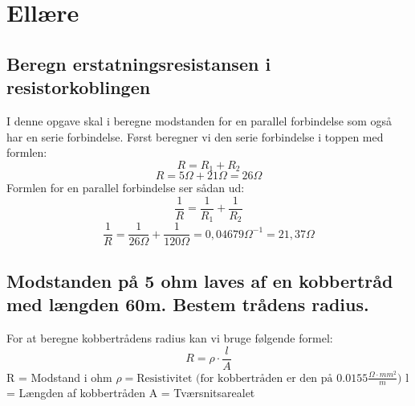 \section{Ellære}
\subsection{Beregn erstatningsresistansen i resistorkoblingen}
I denne opgave skal i beregne modstanden for en parallel forbindelse som også har en serie forbindelse.
Først beregner vi den serie forbindelse i toppen med formlen:
\begin{equation*}
    R=R_{1}+R_{2}
\end{equation*}
\begin{equation*}
    R=5\Omega+21\Omega=26\Omega
\end{equation*}
Formlen for en parallel forbindelse ser sådan ud:
\begin{equation*}
    \frac{1}{R}=\frac{1}{R_{1}}+\frac{1}{R_{2}}
\end{equation*}
\begin{equation*}
    \frac{1}{R}=\frac{1}{26\Omega}+\frac{1}{120\Omega}=0,04679\Omega^{-1}=21,37\Omega
\end{equation*}

\subsection{Modstanden på 5 ohm laves af en kobbertråd med længden 60m. Bestem trådens radius.}
For at beregne kobbertrådens radius kan vi bruge følgende formel:
\begin{equation*}
    R=\rho\cdot\frac{l}{A}
\end{equation*}
R = Modstand i ohm\newline
\begin{math}
    \rho = \text{Resistivitet (for kobbertråden er den på } 0.0155 \frac{\Omega \cdot mm^{2}}{m})
\end{math}\newline
l = Længden af kobbertråden\newline
A = Tværsnitsarealet\newline

